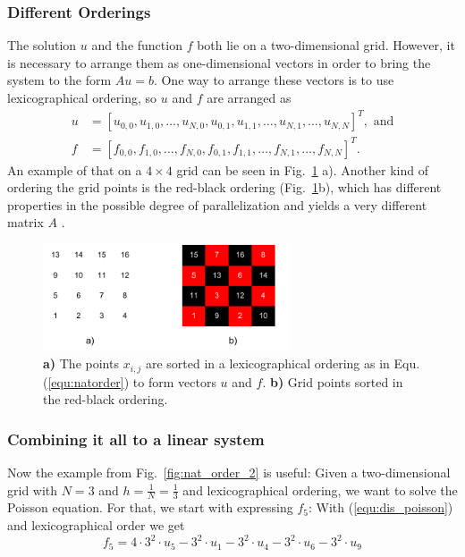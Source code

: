 \subsubsection*{Different Orderings}
The solution $u$ and the function $f$ both lie on a two-dimensional grid. However, it is  necessary to arrange them as one-dimensional vectors in order to bring the system to the form $Au = b$. One way to arrange these vectors is to use lexicographical ordering, so $u$ and $f$ are arranged as
\begin{align}
u &= [u_{0,0}, u_{1,0}, \hdots, u_{N,0}, u_{0,1}, u_{1,1}, \hdots, u_{N,1}, \hdots, u_{N,N} ]^T, \textrm{ and} \label{equ:natorder} \\
f &= [f_{0,0}, f_{1,0}, \hdots, f_{N,0}, f_{0,1}, f_{1,1}, \hdots, f_{N,1}, \hdots, f_{N,N} ]^T. \nonumber
\end{align}
An example of that  on a $4\times 4$ grid can be seen in Fig.~\ref{fig:nat_order_lexi_rb} a). Another kind of ordering the grid points is the red-black ordering (Fig.~\ref{fig:nat_order_lexi_rb}b), which has different properties in the possible degree of parallelization and yields a very different matrix $A$ \cite{Trottenberg:2000:MUL:374106}.


\begin{figure}[tbp]
	\centering
	\includegraphics[width=0.65\textwidth]{chapters/chapter01/linear_order_lexi_rb.pdf}
	\caption{\textbf{a)} The points $x_{i,j}$ are sorted in a lexicographical ordering as in Equ. (\ref{equ:natorder}) to form vectors $u$ and $f$. \textbf{b)} Grid points sorted in the red-black ordering.}
	\label{fig:nat_order_lexi_rb}
\end{figure}

\subsubsection*{Combining it all to a linear system}
Now the example from Fig.~\ref{fig:nat_order_2} is useful: Given a two-dimensional grid with $N = 3$ and $h = \frac{1}{N} = \frac{1}{3}$ and lexicographical ordering, we want to solve the Poisson equation. For that, we start with expressing $f_5$: With (\ref{equ:dis_poisson}) and lexicographical order we get 
\begin{equation}
f_5 = 4 \cdot 3^2 \cdot u_5 - 3^2 \cdot u_1 - 3^2 \cdot u_4  - 3^2 \cdot u_6 - 3^2 \cdot u_9
\end{equation}






